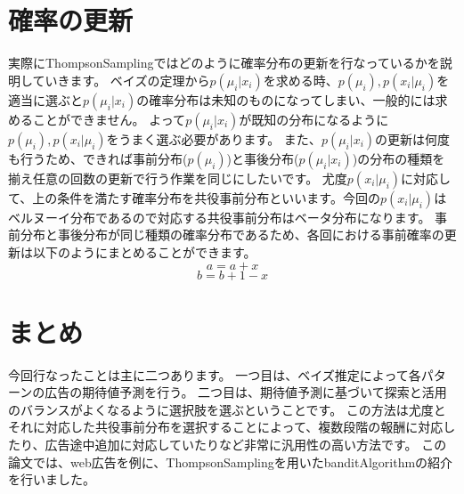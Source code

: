 \documentclass[a4j,twocolumn]{jarticle}
\begin{document}
\vspace{-6mm}
\section{確率の更新}
実際にThompsonSamplingではどのように確率分布の更新を行なっているかを説明していきます。
ベイズの定理から$p(\mu_i|x_i)$を求める時、$p(\mu_i), p(x_i|\mu_i)$を適当に選ぶと$p(\mu_i|x_i)$の確率分布は未知のものになってしまい、一般的には求めることができません。
よって$p(\mu_i|x_i)$が既知の分布になるように$p(\mu_i), p(x_i|\mu_i)$をうまく選ぶ必要があります。
また、$p(\mu_i|x_i)$の更新は何度も行うため、できれば事前分布($p(\mu_i)$)と事後分布($p(\mu_i|x_i)$)の分布の種類を揃え任意の回数の更新で行う作業を同じにしたいです。
尤度$p(x_i|\mu_i)$に対応して、上の条件を満たす確率分布を共役事前分布といいます。今回の$p(x_i|\mu_i)$はベルヌーイ分布であるので対応する共役事前分布はベータ分布になります。
事前分布と事後分布が同じ種類の確率分布であるため、各回における事前確率の更新は以下のようにまとめることができます。
\begin{displaymath}
a = a + x
\end{displaymath}
\begin{displaymath}
b = b + 1 - x
\end{displaymath}
\vspace{-6mm}
\section{まとめ}
今回行なったことは主に二つあります。
一つ目は、ベイズ推定によって各パターンの広告の期待値予測を行う。
二つ目は、期待値予測に基づいて探索と活用のバランスがよくなるように選択肢を選ぶということです。
この方法は尤度とそれに対応した共役事前分布を選択することによって、複数段階の報酬に対応したり、広告途中追加に対応していたりなど非常に汎用性の高い方法です。
この論文では、web広告を例に、ThompsonSamplingを用いたbanditAlgorithmの紹介を行いました。
\end{document}

